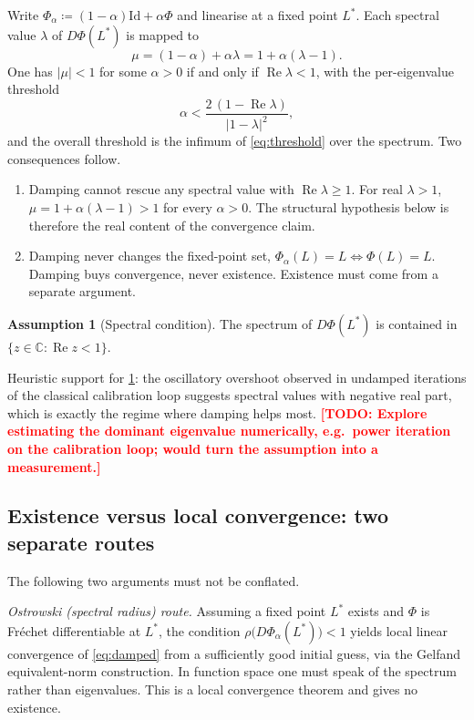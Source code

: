 \documentclass[11pt,a4paper]{article}
\theoremstyle{plain}
\theoremstyle{definition}
\newtheorem{assumption}{Assumption}
\theoremstyle{definition}
\newcommand{\inlinetodo}[1]{\textcolor{red}{\textbf{[TODO: #1]}}}
\newcommand{\abs}[1]{\left\lvert #1 \right\rvert}
\newcommand{\Lev}{L}
\newcommand{\Phimap}{\Phi}
\newcommand{\Phal}{\Phi_\alpha}
\newcommand{\Id}{\mathrm{Id}}
\begin{document}
Write $\Phal \coloneqq (1-\alpha)\Id + \alpha\Phimap$ and linearise at a fixed point $\Lev^*$. Each spectral value $\lambda$ of $D\Phimap(\Lev^*)$ is mapped to
\begin{equation}\label{eq:mumap}
  \mu = (1-\alpha) + \alpha\lambda = 1 + \alpha(\lambda - 1).
\end{equation}
One has $\abs{\mu} < 1$ for some $\alpha > 0$ if and only if $\operatorname{Re}\lambda < 1$, with the per-eigenvalue threshold
\begin{equation}\label{eq:threshold}
  \alpha < \frac{2\,(1 - \operatorname{Re}\lambda)}{\abs{1 - \lambda}^2},
\end{equation}
and the overall threshold is the infimum of \cref{eq:threshold} over the spectrum. Two consequences follow.
\begin{enumerate}
\item Damping cannot rescue any spectral value with $\operatorname{Re}\lambda \geq 1$. For real $\lambda > 1$, $\mu = 1 + \alpha(\lambda - 1) > 1$ for every $\alpha > 0$. The structural hypothesis below is therefore the real content of the convergence claim.
\item Damping never changes the fixed-point set, $\Phal(\Lev) = \Lev \iff \Phimap(\Lev) = \Lev$. Damping buys convergence, never existence. Existence must come from a separate argument.
\end{enumerate}

\begin{assumption}[Spectral condition]\label{ass:spectral}
The spectrum of $D\Phimap(\Lev^*)$ is contained in $\{z \in \mathbb{C} : \operatorname{Re} z < 1\}$.
\end{assumption}

Heuristic support for \cref{ass:spectral}: the oscillatory overshoot observed in undamped iterations of the classical calibration loop suggests spectral values with negative real part, which is exactly the regime where damping helps most. \inlinetodo{Explore estimating the dominant eigenvalue numerically, e.g.\ power iteration on the calibration loop; would turn the assumption into a measurement.}

\subsection{Existence versus local convergence: two separate routes}

The following two arguments must not be conflated.

\emph{Ostrowski (spectral radius) route.} Assuming a fixed point $\Lev^*$ exists and $\Phimap$ is Fr\'echet differentiable at $\Lev^*$, the condition $\rho\bigl(D\Phal(\Lev^*)\bigr) < 1$ yields local linear convergence of \cref{eq:damped} from a sufficiently good initial guess, via the Gelfand equivalent-norm construction. In function space one must speak of the spectrum rather than eigenvalues. This is a local convergence theorem and gives no existence.
\end{document}
